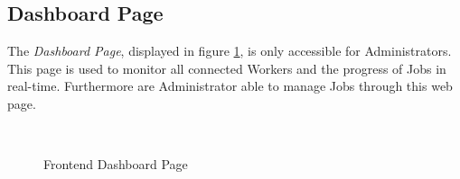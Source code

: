 \subsection{Dashboard Page}
\label{subsec:implementation:dashboard-page}
The \emph{Dashboard Page}, displayed in figure \ref{fig:implementation:dashboard-page}, is only accessible for Administrators. This page is used to monitor all connected Workers and the progress of Jobs in real-time. Furthermore are Administrator able to manage Jobs through this web page.
\begin{figure}[ht!]
    \myfloatalign
     \\
    \caption{Frontend Dashboard Page}
    \label{fig:implementation:dashboard-page}
\end{figure}
